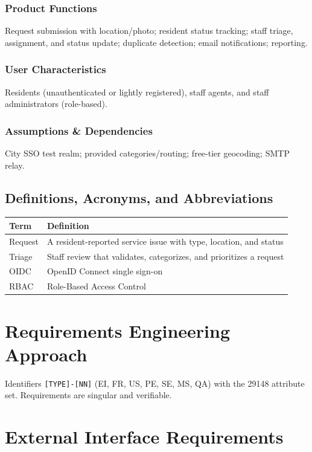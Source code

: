\documentclass[11pt,letterpaper]{article}
\begin{document}
\subsubsection{Product Functions}
Request submission with location/photo; resident status tracking; staff triage,
assignment, and status update; duplicate detection; email notifications; reporting.
\subsubsection{User Characteristics}
Residents (unauthenticated or lightly registered), staff agents, and staff
administrators (role-based). \subsubsection{Assumptions \& Dependencies}
City SSO test realm; provided categories/routing; free-tier geocoding; SMTP relay.
\subsection{Definitions, Acronyms, and Abbreviations}
\begin{table}[H]\begin{center}\begin{tabular}{ | p{3cm} | p{10cm} |}\hline
\textbf{Term} & \textbf{Definition} \\ \hline
Request & A resident-reported service issue with type, location, and status \\ \hline
Triage & Staff review that validates, categorizes, and prioritizes a request \\ \hline
OIDC & OpenID Connect single sign-on \\ \hline
RBAC & Role-Based Access Control \\ \hline
\end{tabular}\end{center}\end{table}
\newpage

\section{Requirements Engineering Approach}
Identifiers \texttt{[TYPE]-[NN]} (EI, FR, US, PE, SE, MS, QA) with the 29148
attribute set. Requirements are singular and verifiable.
\newpage

\section{External Interface Requirements}
\end{document}
